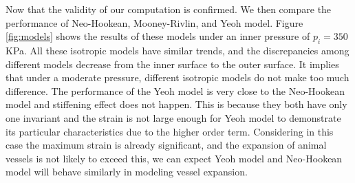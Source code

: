 Now that the validity of our computation is confirmed. We then compare the performance of Neo-Hookean, Mooney-Rivlin, and Yeoh model. Figure \ref{fig:models} shows the results of these models under an inner pressure of $p_i = 350$ KPa. All these isotropic models have similar trends, and the discrepancies among different models decrease from the inner surface to the outer surface. It implies that under a moderate pressure, different isotropic models do not make too much difference. The performance of the Yeoh model is very close to the Neo-Hookean model and stiffening effect does not happen. This is because they both have only one invariant and the strain is not large enough for Yeoh model to demonstrate its particular characteristics due to the higher order term. Considering in this case the maximum strain is already significant, and the expansion of animal vessels is not likely to exceed this, we can expect Yeoh model and Neo-Hookean model will behave similarly in modeling vessel expansion.

